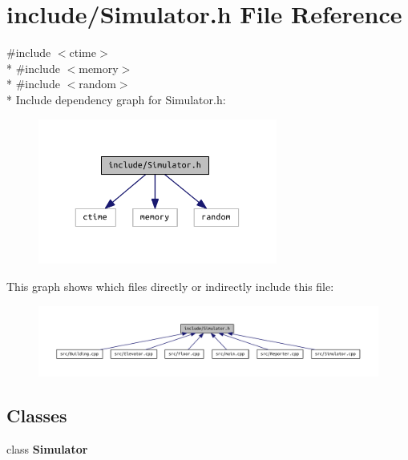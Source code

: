 \section{include/\+Simulator.h File Reference}
\label{_simulator_8h}
{\ttfamily \#include $<$ctime$>$}\\*
{\ttfamily \#include $<$memory$>$}\\*
{\ttfamily \#include $<$random$>$}\\*
Include dependency graph for Simulator.\+h\+:\nopagebreak
\begin{figure}[H]
\begin{center}
\leavevmode
\includegraphics[width=223pt]{_simulator_8h__incl}
\end{center}
\end{figure}
This graph shows which files directly or indirectly include this file\+:\nopagebreak
\begin{figure}[H]
\begin{center}
\leavevmode
\includegraphics[width=350pt]{_simulator_8h__dep__incl}
\end{center}
\end{figure}
\subsection*{Classes}
\begin{DoxyCompactItemize}
\item 
class {\bf Simulator}
\end{DoxyCompactItemize}
